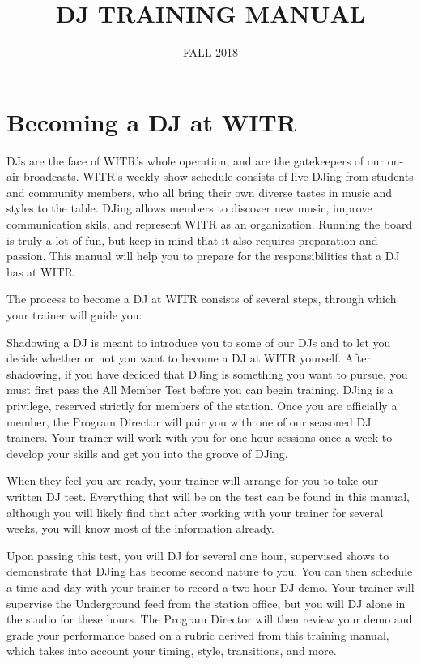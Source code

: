 \documentclass{witrman}
\title{DJ TRAINING MANUAL}
\date{FALL 2018}
\begin{document}
\maketitle

\maketoc{}

\setpagebg{}

\chapter{Becoming a DJ at WITR}

DJs are the face of WITR's whole operation, and are the gatekeepers of our
on-air broadcasts.  WITR's weekly show schedule consists of live DJing from
students and community members, who all bring their own diverse tastes in music
and styles to the table.  DJing allows members to discover new music, improve
communication skils, and represent WITR as an organization.  Running the board
is truly a lot of fun, but keep in mind that it also requires preparation and
passion.  This manual will help you to prepare for the responsibilities that a
DJ has at WITR\@.

The process to become a DJ at WITR consists of several steps, through which your
trainer will guide you:


Shadowing a DJ is meant to introduce you to some of our DJs and to let you
decide whether or not you want to become a DJ at WITR yourself.  After
shadowing, if you have decided that DJing is something you want to pursue, you
must first pass the All Member Test before you can begin training.  DJing is a
privilege, reserved strictly for members of the station.  Once you are
officially a member, the Program Director will pair you with one of our seasoned
DJ trainers.  Your trainer will work with you for one hour sessions once a week
to develop your skills and get you into the groove of DJing.

When they feel you are ready, your trainer will arrange for you to take our
written DJ test.  Everything that will be on the test can be found in this
manual, although you will likely find that after working with your trainer for
several weeks, you will know most of the information already.

Upon passing this test, you will DJ for several one hour, supervised shows to
demonstrate that DJing has become second nature to you.  You can then schedule a
time and day with your trainer to record a two hour DJ demo.  Your trainer will
supervise the Underground feed from the station office, but you will DJ alone in
the studio for these hours.  The Program Director will then review your demo and
grade your performance based on a rubric derived from this training manual,
which takes into account your timing, style, transitions, and more.
\end{document}
